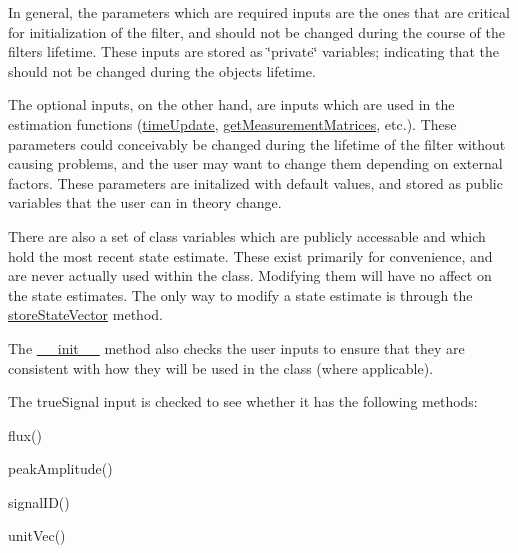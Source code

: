 In general, the parameters which are required inputs are the ones that are critical for initialization of the filter, and should not be changed during the course of the filter\textquotesingle{}s lifetime. These inputs are stored as \char`\"{}private\char`\"{} variables; indicating that the should not be changed during the object\textquotesingle{}s lifetime.

The optional inputs, on the other hand, are inputs which are used in the estimation functions (\hyperlink{classSignalCorrelationSubstate_1_1CorrelationFilter_a07a8c37a30c3d0a057049e0ff2eac67f}{time\+Update}, \hyperlink{classSignalCorrelationSubstate_1_1CorrelationFilter_ae7338456be781e322eba5bce4e41199f}{get\+Measurement\+Matrices}, etc.). These parameters could conceivably be changed during the lifetime of the filter without causing problems, and the user may want to change them depending on external factors. These parameters are initalized with default values, and stored as public variables that the user can in theory change.

There are also a set of class variables which are publicly accessable and which hold the most recent state estimate. These exist primarily for convenience, and are never actually used within the class. Modifying them will have no affect on the state estimates. The only way to modify a state estimate is through the \hyperlink{classSignalCorrelationSubstate_1_1CorrelationFilter_a94b5211aa159578344974b52f3b9f92e}{store\+State\+Vector} method.

The \hyperlink{classSignalCorrelationSubstate_1_1CorrelationFilter_a98d7aaf451122a2bc10fdcffafcf1768}{\+\_\+\+\_\+init\+\_\+\+\_\+} method also checks the user inputs to ensure that they are consistent with how they will be used in the class (where applicable).

The true\+Signal input is checked to see whether it has the following methods\+:
\begin{DoxyItemize}
\item flux()
\item peak\+Amplitude()
\item signal\+I\+D()
\item unit\+Vec()
\end{DoxyItemize}


